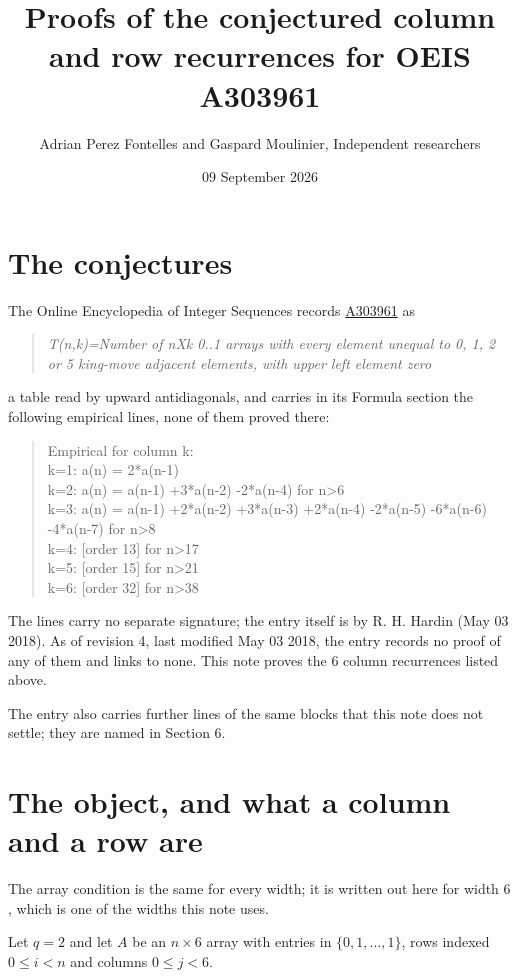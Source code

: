 \documentclass[11pt]{article}
\title{Proofs of the conjectured column and row recurrences for OEIS A303961}
\author{Adrian Perez Fontelles and Gaspard Moulinier, Independent researchers}
\date{09 September 2026}
\theoremstyle{definition}
\begin{document}
\maketitle
\section{The conjectures}

The Online Encyclopedia of Integer Sequences records \href{https://oeis.org/A303961}{A303961} as

\begin{quote}\itshape T(n,k)=Number of nXk 0..1 arrays with every element unequal to 0, 1, 2 or 5 king-move adjacent elements, with upper left element zero\end{quote}

a table read by upward antidiagonals, and carries in its Formula section the following empirical lines, none of them proved there:

\begin{quote}\ttfamily Empirical for column k:\\
k=1: a(n) = 2*a(n-1)\\k=2: a(n) = a(n-1) +3*a(n-2) -2*a(n-4) for n>6\\k=3: a(n) = a(n-1) +2*a(n-2) +3*a(n-3) +2*a(n-4) -2*a(n-5) -6*a(n-6) -4*a(n-7) for n>8\\k=4: [order 13] for n>17\\k=5: [order 15] for n>21\\k=6: [order 32] for n>38\end{quote}

The lines carry no separate signature; the entry itself is by R. H. Hardin (May 03 2018). As of revision 4, last modified May 03 2018, the entry records no proof of any of them and links to none. This note proves the 6 column recurrences listed above.

The entry also carries further lines of the same blocks that this note does not settle; they are named in Section 6.

\section{The object, and what a column and a row are}

The array condition is the same for every width; it is written out here for width $6$, which is one of the widths this note uses.

Let $q = 2$ and let $A$ be an $n \times 6$ array with entries in $\{0,1,\dots,1\}$, rows indexed $0 \le i < n$ and columns $0 \le j < 6$.
\end{document}
